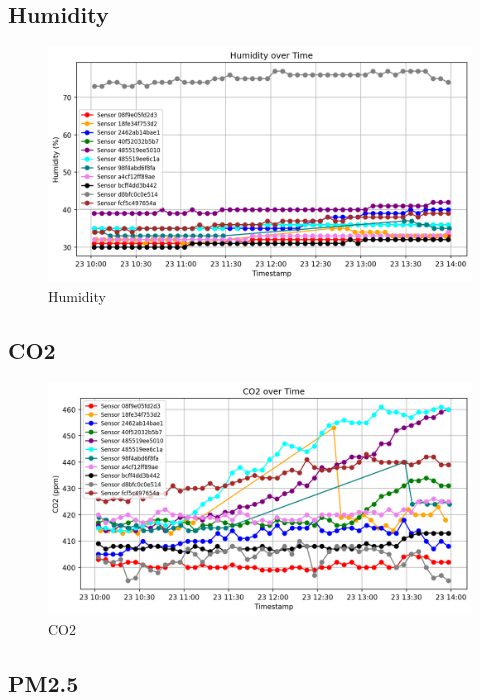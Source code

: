 \documentclass[
  12pt,
  letterpaper,
]{article}
\begin{document}
\subsection{Humidity}\label{humidity}

\begin{figure}[H]

{\centering \includegraphics[width=0.85\linewidth,height=\textheight,keepaspectratio]{./charts/humidity_chart.png}

}

\caption{Humidity}

\end{figure}%

\subsection{CO2}\label{co2}

\begin{figure}[H]

{\centering \includegraphics[width=0.85\linewidth,height=\textheight,keepaspectratio]{./charts/co2_chart.png}

}

\caption{CO2}

\end{figure}%

\subsection{PM2.5}\label{pm2.5}
\end{document}
